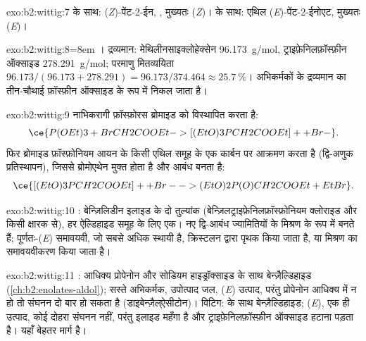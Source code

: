 \begin{solution}{exo:b2:wittig:7}
 के साथ: (\textit{Z})-पेंट-2-ईन, , मुख्यतः (\textit{Z})।
 के साथ: एथिल (\textit{E})-पेंट-2-ईनोएट, मुख्यतः (\textit{E})।
\end{solution}

\begin{solution}{exo:b2:wittig:8}\emergencystretch=8em
। द्रव्यमान: मेथिलीनसाइक्लोहेक्सेन \qty{96.173}{g/mol},
ट्राइफ़ेनिलफ़ॉस्फ़ीन ऑक्साइड \qty{278.291}{g/mol}; परमाणु मितव्ययिता $96.173/(96.173 + 278.291) =
96.173/374.464 \approx 25.7~\%$। अभिकर्मकों के द्रव्यमान का तीन-चौथाई फ़ॉस्फ़ीन ऑक्साइड के रूप में निकल जाता है।
\end{solution}

\begin{solution}{exo:b2:wittig:9}
नाभिकरागी फ़ॉस्फ़ोरस ब्रोमाइड को विस्थापित करता है:
\begin{equation*}
\ce{P(OEt)3 + BrCH2COOEt -> [(EtO)3PCH2COOEt]+ + Br-}.
\end{equation*}
फिर ब्रोमाइड
फ़ॉस्फ़ोनियम आयन के किसी एथिल समूह के एक कार्बन पर आक्रमण करता है (द्वि-अणुक प्रतिस्थापन), जिससे
ब्रोमोएथेन मुक्त होता है और  आबंध बनता है:
\begin{equation*}
\ce{[(EtO)3PCH2COOEt]+ + Br- -> (EtO)2P(O)CH2COOEt + EtBr}.
\end{equation*}
\end{solution}

\begin{solution}{exo:b2:wittig:10}
: बेन्ज़िलिडीन इलाइड के दो तुल्यांक
(बेन्ज़िलट्राइफ़ेनिलफ़ॉस्फ़ोनियम क्लोराइड और किसी क्षारक से), हर ऐल्डिहाइड समूह के लिए एक।
नए द्वि-आबंध ज्यामितियों के मिश्रण के रूप में बनते हैं; पूर्णतः-(\textit{E}) समावयवी, जो सबसे अधिक
स्थायी है, क्रिस्टलन द्वारा पृथक किया जाता है, या मिश्रण का समावयवीकरण किया जाता है।
\end{solution}

\begin{solution}{exo:b2:wittig:11}
: आधिक्य प्रोपेनोन और सोडियम हाइड्रॉक्साइड के साथ बेन्ज़ैल्डिहाइड (\cref{ch:b2:enolates-aldol});
सस्ते अभिकर्मक, उपोत्पाद जल, (\textit{E}) उत्पाद, परंतु प्रोपेनोन आधिक्य में न हो तो संघनन दो बार हो सकता है
(डाइबेन्ज़ैल्ऐसीटोन)। विटिग: 
 के साथ बेन्ज़ैल्डिहाइड; (\textit{E}), एक ही उत्पाद, कोई दोहरा संघनन नहीं, परंतु इलाइड महँगा है और
ट्राइफ़ेनिलफ़ॉस्फ़ीन ऑक्साइड हटाना पड़ता है। यहाँ  बेहतर मार्ग है।
\end{solution}

